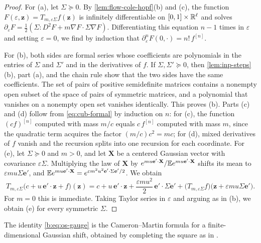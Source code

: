 \begin{proof}
For (a), let $\Sigma\succeq0$. By \cref{lem:flow-cole-hopf}(b) and (c), the
function $F(\varepsilon,\mathbf z)=T_{m,\varepsilon\Sigma}f(\mathbf z)$ is
infinitely differentiable on $[0,1]\times\mathbb R^\ell$ and solves
$\partial_\varepsilon F=\frac12(\Sigma\mathbin:D^2F+m\nabla F\cdot\Sigma\nabla F)$.
Differentiating this equation $n-1$ times in $\varepsilon$ and setting
$\varepsilon=0$, we find by induction that
$\partial_\varepsilon^nF(0,\cdot)=n!\,f^{[n]}$.

For (b), both sides are formal series whose coefficients are polynomials in
the entries of $\Sigma$ and $\Sigma'$ and in the derivatives of $f$. If
$\Sigma,\Sigma'\succeq0$, then \cref{lem:inp-steps}(b), part (a), and the chain
rule show that the two sides have the same coefficients. The set of pairs of
positive semidefinite matrices contains a nonempty open subset of the space of
pairs of symmetric matrices, and a polynomial that vanishes on a nonempty open
set vanishes identically. This proves (b). Parts (c) and (d) follow from
\eqref{eq:cub-formal} by induction on $n$: for (c), the function $(cf)^{[n]}$
computed with mass $m/c$ equals $c\,f^{[n]}$ computed with mass $m$, since the
quadratic term acquires the factor $(m/c)c^2=mc$; for (d), mixed derivatives of
$f$ vanish and the recursion splits into one recursion for each coordinate. For
(e), let $\Sigma\succeq0$ and $m>0$, and let $\mathbf X$ be a centered Gaussian
vector with covariance $\varepsilon\Sigma$. Multiplying the law of
$\mathbf X$ by $e^{mu\mathbf e'\cdot\mathbf X}/\mathbb E e^{mu\mathbf e'\cdot\mathbf X}$
shifts its mean to $\varepsilon mu\Sigma\mathbf e'$, and
$\mathbb E e^{mu\mathbf e'\cdot\mathbf X}=e^{\varepsilon m^2u^2\mathbf
e'\cdot\Sigma\mathbf e'/2}$. We obtain
\begin{equation}\label{b:eq:os-gauge}
 T_{m,\varepsilon\Sigma}\bigl(c+u\,\mathbf e'\cdot\mathbf z+f\bigr)(\mathbf z)
 =c+u\,\mathbf e'\cdot\mathbf z+\frac{\varepsilon mu^2}2\,\mathbf e'\cdot\Sigma\mathbf e'
 +\bigl(T_{m,\varepsilon\Sigma}f\bigr)\bigl(\mathbf z+\varepsilon mu\Sigma\mathbf e'\bigr).
\end{equation}
For $m=0$ this is immediate. Taking Taylor series in $\varepsilon$ and
arguing as in (b), we obtain (e) for every symmetric $\Sigma$.
\end{proof}

The identity \eqref{b:eq:os-gauge} is the Cameron--Martin formula for a
finite-dimensional Gaussian shift, obtained by completing the square as in
\cite[Section~A.3, (A.6)]{talagrand-2011}.

